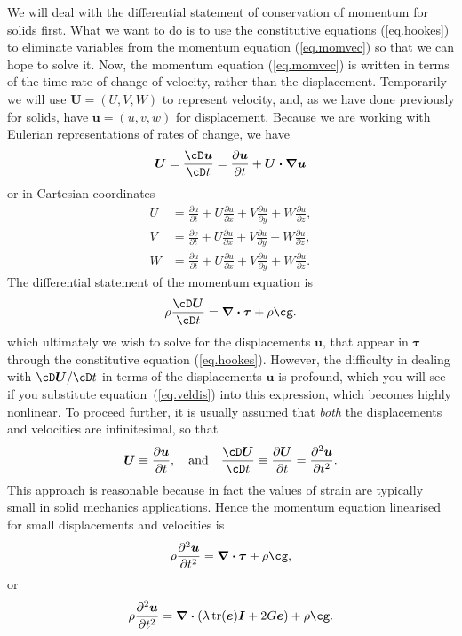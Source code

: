 \documentclass[twoside,11pt]		{report}
\begin{document}
We will deal with the differential statement of conservation of
momentum for solids first. What we want to do is to use the
constitutive equations (\ref{eq.hookes}) to eliminate variables from
the momentum equation (\ref{eq.momvec}) so that we can hope to solve
it. Now, the momentum equation (\ref{eq.momvec}) is written in terms
of the time rate of change of velocity, rather than the
displacement. Temporarily we will use $\bm{U}=(U,V,W)$ to represent
velocity, and, as we have done previously for solids, have
$\bm{u}=(u,v,w)$ for displacement. Because we are working with
Eulerian representations of rates of change, we have
\begin{equation}
\bm{U}=\frac{\cD\bm{u}}{\cD t}=
\frac{\partial\bm{u}}{\partial t} + \bm{U\cdot\nabla u}
\label{eq.veldis}
\end{equation}
or in Cartesian coordinates
\begin{align}
U & = \frac{\partial u}{\partial t} +
 U\frac{\partial u}{\partial x} +
 V\frac{\partial u}{\partial y} +
 W\frac{\partial u}{\partial z}, \\
V & = \frac{\partial v}{\partial t} +
 U\frac{\partial u}{\partial x} +
 V\frac{\partial u}{\partial y} +
 W\frac{\partial u}{\partial z}, \\
W & = \frac{\partial u}{\partial t} +
 U\frac{\partial u}{\partial x} +
 V\frac{\partial u}{\partial y} +
 W\frac{\partial u}{\partial z}.
\end{align}
The differential statement of the momentum equation is
\begin{equation}
\rho\frac{\cD \bm{U}}{\cD t}=\bm{\nabla\cdot\tau} + \rho\bm{\cg}.
\end{equation}
which ultimately we wish to solve for the displacements $\bm{u}$, that
appear in $\bm{\tau}$ through the constitutive equation
(\ref{eq.hookes}). However, the difficulty in dealing with
$\cD\bm{U}/\cD t$ in terms of the displacements $\bm{u}$ is profound,
which you will see if you substitute equation~(\ref{eq.veldis}) into
this expression, which becomes highly nonlinear. To proceed further,
it is usually assumed that \emph{both} the displacements and
velocities are infinitesimal, so that
\[
\bm{U} \equiv \frac{\partial \bm{u}}{\partial t}, \quad\textrm{and}\quad
\frac{\cD \bm{U}}{\cD t}\equiv\frac{\partial\bm{U}}{\partial t}=
\frac{\partial^2 \bm{u}}{\partial t^2}.
\]
This approach is reasonable because in fact the values of strain are
typically small in solid mechanics applications.  Hence the momentum
equation linearised for small displacements and velocities is
\begin{equation}
\rho\frac{\partial^2 \bm{u}}{\partial t^2}=\bm{\nabla\cdot\tau} + \rho\bm{\cg},
\end{equation}
or 
\begin{equation}
\rho\frac{\partial^2 \bm{u}}{\partial t^2}=
\bm{\nabla\cdot}\left(\lambda\,\mathrm{tr}(\bm{e})\bm{I} + 2 G\bm{e}\right) +
\rho\bm{\cg}.
\end{equation}
\end{document}
